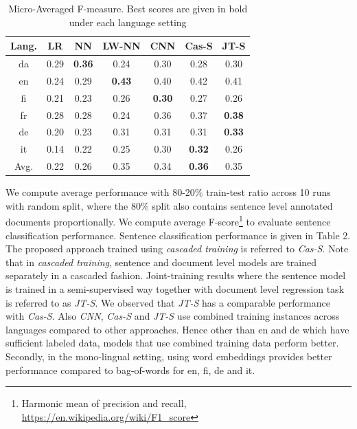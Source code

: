 \documentclass[11pt,a4paper]{article}
\begin{document}
 \begin{table}[!htb]
  \centering
  \begin{tabular}{ c c c c c c c}
  \toprule
    Lang. & LR & NN & LW-NN & CNN & Cas-S & JT-S\\
    \midrule
    da  & 	0.29 & \textbf{0.36} & 0.24 & 0.30 & 0.28 & 0.30\\
    en   &  0.24 & 0.29 & \textbf{0.43} & 0.40 & 0.42 & 0.41\\    	
    fi  &   0.21 & 0.23 & 0.26 & \textbf{0.30} & 0.27 & 0.26\\
    fr    & 0.28 & 0.28 & 0.24 & 0.36 & 0.37 & \textbf{0.38} \\
    de    &  0.20 & 0.23 & 0.31 & 0.31 & 0.31 & \textbf{0.33}\\
    it    & 0.14 & 0.22 & 0.25 & 0.30 & \textbf{0.32} & 0.26\\
\midrule
Avg.    & 0.22 & 0.26 & 0.35 & 0.34 & \textbf{0.36} & 0.35\\
    \bottomrule

  \end{tabular}
  \caption{Micro-Averaged F-measure. Best scores are given in bold under each language setting}
  \label{tab:al}
\end{table}

We compute average performance with 80-20\% train-test ratio across 10 runs with random split, where the 80\% split also contains sentence level annotated documents proportionally.  We compute average F-score\footnote{Harmonic mean of precision and recall, \url{https://en.wikipedia.org/wiki/F1_score}} to evaluate sentence classification performance. Sentence classification performance is given in Table 2. The proposed approach trained using \textit{cascaded training} is referred to \textit{Cas-S}. Note that in \textit{cascaded training}, sentence and document level models are trained separately in a cascaded fashion. Joint-training results where the sentence model is trained in a semi-supervised way together with document level regression task is referred to as \textit{JT-S}.  We observed that \textit{JT-S} has a comparable performance with \textit{Cas-S}. Also \textit{CNN}, \textit{Cas-S} and \textit{JT-S} use combined training instances across languages compared to other approaches. Hence other than en and de which have sufficient labeled data, models that use combined training data perform better. Secondly, in the mono-lingual setting, using word embeddings provides better performance compared to bag-of-words for en, fi, de and it.
\end{document}
